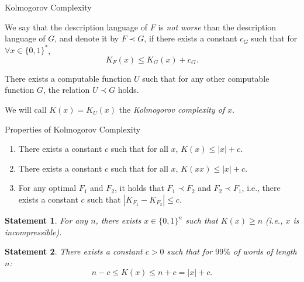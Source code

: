\documentclass[
aspectratio=169]{beamer}
\newtheorem{statement}{Statement}
\newcommand{\bits}{\{0,1\}}
\newcommand{\bitstr}{\bits^*}
\begin{document}
\begin{frame}{Kolmogorov Complexity}
\begin{definition}
    We say that the description language of $F$ is \emph{not worse} than the description language of $G$, and denote it by $F \prec G$, if there exists a constant $c_G$ such that for $\forall x \in \bitstr$,
    \[K_F(x) \le K_G(x) + c_G.\]
\end{definition}

\pause
\begin{theorem}\label{thm:solomonov-kolmogorov}
    There exists a computable function $U$ such that for any other computable function $G$, the relation $U \prec G$ holds.
\end{theorem}

\begin{definition}
    We will call $K(x) = K_U(x)$ the \emph{Kolmogorov complexity of $x$}.
\end{definition}

\end{frame}


\begin{frame}[fragile]{Properties of Kolmogorov Complexity}

    \begin{enumerate}
    \item There exists a constant $c$ such that for all $x$, $K(x) \le |x| + c$.
    \item There exists a constant $c$ such that for all $x$, $K(xx) \le |x| + c$.
    \item For any optimal $F_1$ and $F_2$, it holds that $F_1 \prec F_2$ and $F_2 \prec F_1$, i.e., there exists a constant $c$ such that
    \(
    |K_{F_1} - K_{F_2}| \le c.
    \)
\end{enumerate}
\pause
\begin{statement}
    For any $n$, there exists $x \in \{0,1\}^n$ such that $K(x) \ge n$ (i.e., $x$ is incompressible).
\end{statement}

\begin{statement}
    There exists a constant $c > 0$ such that for $99\%$ of words of length $n$:
    \[
    n - c \le K(x) \le n + c = |x| + c.
    \]
\end{statement}
\end{frame}
\end{document}

